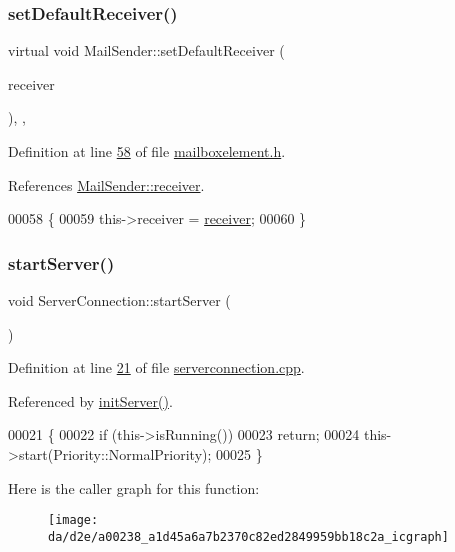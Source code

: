 \subsubsection{\texorpdfstring{set\+Default\+Receiver()}{setDefaultReceiver()}}
{\footnotesize\ttfamily virtual void Mail\+Sender\+::set\+Default\+Receiver (\begin{DoxyParamCaption}\item[{\hyperlink{a00154}{Mail\+Receiver} $\ast$}]{receiver }\end{DoxyParamCaption})\hspace{0.3cm}{\ttfamily [inline]}, {\ttfamily [virtual]}, {\ttfamily [inherited]}}



Definition at line \hyperlink{a00005_source_l00058}{58} of file \hyperlink{a00005_source}{mailboxelement.\+h}.



References \hyperlink{a00005_source_l00063}{Mail\+Sender\+::receiver}.


\begin{DoxyCode}
00058                                                           \{
00059     this->receiver = \hyperlink{a00162_aa57ce2f74f8ad76abb38974f85b97ac5}{receiver};
00060   \}
\end{DoxyCode}
\mbox{\label{a00238_a1d45a6a7b2370c82ed2849959bb18c2a}} 
\subsubsection{\texorpdfstring{start\+Server()}{startServer()}}
{\footnotesize\ttfamily void Server\+Connection\+::start\+Server (\begin{DoxyParamCaption}{ }\end{DoxyParamCaption})}



Definition at line \hyperlink{a00128_source_l00021}{21} of file \hyperlink{a00128_source}{serverconnection.\+cpp}.



Referenced by \hyperlink{a00290_source_l00020}{init\+Server()}.


\begin{DoxyCode}
00021                                    \{
00022   \textcolor{keywordflow}{if} (this->isRunning())
00023     \textcolor{keywordflow}{return};
00024   this->start(Priority::NormalPriority);
00025 \}
\end{DoxyCode}
Here is the caller graph for this function\+:
\nopagebreak
\begin{figure}[H]
\begin{center}
\leavevmode
\texttt{[image: da/d2e/a00238\_a1d45a6a7b2370c82ed2849959bb18c2a\_icgraph]}
\end{center}
\end{figure}


